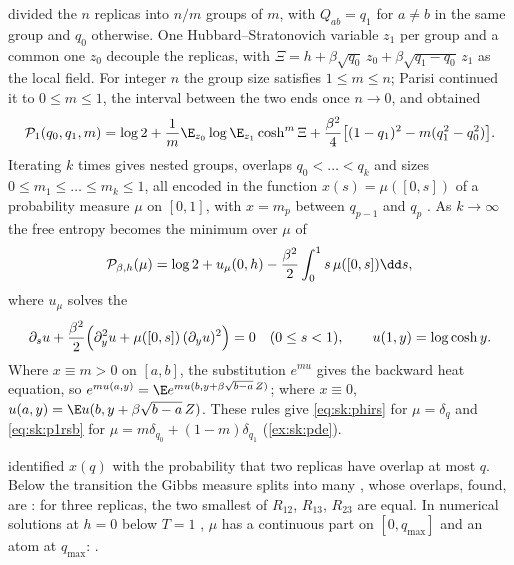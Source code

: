\begin{refsection}
\begin{heuristic}
\textcite{Parisi1979b} divided the $n$ replicas into $n/m$ groups of $m$, with $Q_{ab}=q_1$ for $a\ne b$ in the same group and $q_0$ otherwise. One Hubbard--Stratonovich variable $z_1$ per group and a common one $z_0$ decouple the replicas, with $\Xi=h+\beta\sqrt{q_0}\,z_0+\beta\sqrt{q_1-q_0}\,z_1$ as the local field. For integer $n$ the group size satisfies $1\le m\le n$; Parisi continued it to $0\le m\le1$, the interval between the two ends once $n\to0$, and obtained
\begin{equation}\label{eq:sk:p1rsb}
\skPar_1(q_0,q_1,m)=\log2+\frac1m\E_{z_0}\log\E_{z_1}\cosh^m\Xi+\frac{\beta^2}4\bigl[(1-q_1)^2-m(q_1^2-q_0^2)\bigr].
\end{equation}
Iterating $k$ times gives nested groups, overlaps $q_0<\dots<q_k$ and sizes $0\le m_1\le\dots\le m_k\le1$, all encoded in the function $x(s)=\mu([0,s])$ of a probability measure $\mu$ on $[0,1]$, with $x=m_p$ between $q_{p-1}$ and $q_p$ \parencite{Parisi1980b}. As $k\to\infty$ the free entropy becomes the minimum over $\mu$ of
\begin{equation}\label{eq:sk:parisi}
\skPar_{\beta,h}(\mu)=\log2+u_\mu(0,h)-\frac{\beta^2}2\int_0^1s\,\mu([0,s])\dd s,
\end{equation}
where $u_\mu$ solves the 
\begin{equation}\label{eq:sk:pde}
\partial_su+\frac{\beta^2}2\Bigl(\partial_y^2u+\mu([0,s])\,(\partial_yu)^2\Bigr)=0\quad(0\le s<1),\qquad u(1,y)=\log\cosh y.
\end{equation}
Where $x\equiv m>0$ on $[a,b]$, the substitution $e^{mu}$ gives the backward heat equation, so $e^{mu(a,y)}=\E e^{mu(b,y+\beta\sqrt{b-a}\,Z)}$; where $x\equiv0$, $u(a,y)=\E u(b,y+\beta\sqrt{b-a}\,Z)$. These rules give \eqref{eq:sk:phirs} for $\mu=\delta_q$ and \eqref{eq:sk:p1rsb} for $\mu=m\delta_{q_0}+(1-m)\delta_{q_1}$ (\cref{ex:sk:pde}).
\end{heuristic}

\textcite{Parisi1983} identified $x(q)$ with the probability that two replicas have overlap at most $q$. Below the transition the Gibbs measure splits into many , whose overlaps, \textcite{MezardEtAl1984a} found, are : for three replicas, the two smallest of $R_{12}$, $R_{13}$, $R_{23}$ are equal. In numerical solutions at $h=0$ below $T=1$ \parencite{CrisantiRizzo2002}, $\mu$ has a continuous part on $[0,q_{\max}]$ and an atom at $q_{\max}$: .


\end{refsection}
